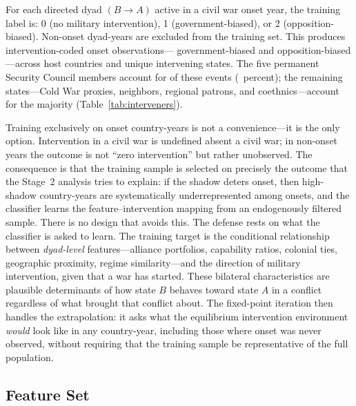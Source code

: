 For each directed dyad $(B \rightarrow A)$ active in a civil war onset year, the
training label is: 0 (no military intervention), 1 (government-biased), or 2
(opposition-biased).  Non-onset dyad-years are excluded from the training set.
This produces \OnsetCoded{} intervention-coded onset observations---\OnsetCodedGov{} government-biased
and \OnsetCodedOpp{} opposition-biased---across \OnsetHosts{} host countries and \OnsetInterveners{} unique intervening
states.  The five permanent Security Council members
account for \PFiveEvents{} of these events (\PFivePct~percent); the remaining
states---Cold War proxies, neighbors, regional patrons, and coethnics---account
for the majority (Table~\ref{tab:interveners}).

Training exclusively on onset country-years is not a convenience---it is
the only option.  Intervention in a civil war is undefined absent a civil war;
in non-onset years the outcome is not ``zero intervention'' but rather
unobserved.  The consequence is that the training sample is selected on
precisely the outcome that the Stage~2 analysis tries to explain: if the
shadow deters onset, then high-shadow country-years are systematically
underrepresented among onsets, and the classifier learns the
feature--intervention mapping from an endogenously filtered sample.  There
is no design that avoids this.  The defense rests on what the classifier
is asked to learn.  The training target is the conditional relationship
between \textit{dyad-level} features---alliance portfolios, capability ratios,
colonial ties, geographic proximity, regime similarity---and the direction
of military intervention, given that a war has started.  These bilateral
characteristics are plausible determinants of how state $B$ behaves toward
state $A$ in a conflict regardless of what brought that conflict about.
The fixed-point iteration then
handles the extrapolation: it asks what the equilibrium intervention
environment \textit{would} look like in any country-year, including those where
onset was never observed, without requiring that the training sample be
representative of the full population.



\subsection{Feature Set}


